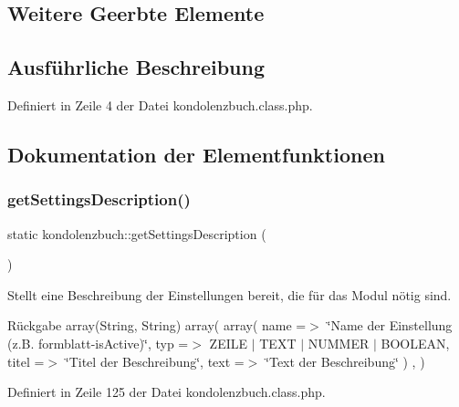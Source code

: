 \subsection*{Weitere Geerbte Elemente}


\subsection{Ausführliche Beschreibung}


Definiert in Zeile 4 der Datei kondolenzbuch.\+class.\+php.



\subsection{Dokumentation der Elementfunktionen}
\mbox{\label{classkondolenzbuch_acd4a3ca52c2042b60155c2401d7bf813}} 
\subsubsection{\texorpdfstring{get\+Settings\+Description()}{getSettingsDescription()}}
{\footnotesize\ttfamily static kondolenzbuch\+::get\+Settings\+Description (\begin{DoxyParamCaption}{ }\end{DoxyParamCaption})\hspace{0.3cm}{\ttfamily [static]}}

Stellt eine Beschreibung der Einstellungen bereit, die für das Modul nötig sind. \begin{DoxyReturn}{Rückgabe}
array(\+String, String) array( array( \textquotesingle{}name\textquotesingle{} =$>$ \char`\"{}\+Name der Einstellung (z.\+B. formblatt-\/is\+Active)\char`\"{}, \textquotesingle{}typ\textquotesingle{} =$>$ Z\+E\+I\+LE $\vert$ T\+E\+XT $\vert$ N\+U\+M\+M\+ER $\vert$ B\+O\+O\+L\+E\+AN, \textquotesingle{}titel\textquotesingle{} =$>$ \char`\"{}\+Titel der Beschreibung\char`\"{}, \textquotesingle{}text\textquotesingle{} =$>$ \char`\"{}\+Text der Beschreibung\char`\"{} ) , ) 
\end{DoxyReturn}


Definiert in Zeile 125 der Datei kondolenzbuch.\+class.\+php.

\mbox{\label{classkondolenzbuch_adcc8168234501a539980e4eb07c511e9}} 
